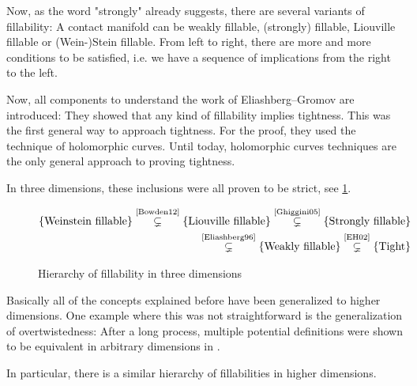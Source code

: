 Now, as the word "strongly" already suggests, there are several variants of fillability:
A contact manifold can be weakly fillable, (strongly) fillable, Liouville fillable or (Wein-)Stein fillable.
From left to right, there are more and more conditions to be satisfied, i.e. we have a sequence
of implications from the right to the left.

Now, all components to understand the work of Eliashberg--Gromov are introduced:
They showed that any kind of fillability implies tightness.
This was the first general way to approach tightness.
For the proof, they used the technique of holomorphic curves. Until today, holomorphic curves techniques are
the only general approach to proving tightness.

In three dimensions, these inclusions were all proven to be strict, see \cref{fig:fillability}.
\begin{figure}
    \begin{align*}
        \{\text{Weinstein fillable}\} \stackrel{\text{\cite{Bowden12}}}{\subsetneq} 
        \{\text{Liouville fillable}\} \stackrel{\text{\cite{Ghiggini05}}}{\subsetneq} 
        \{\text{Strongly  fillable}\}\\ \stackrel{\text{\cite{Eliashberg96}}}{\subsetneq}
        \{\text{Weakly    fillable}\} \stackrel{\text{\cite{EH02}}}{\subsetneq}
        \{\text{Tight}\}
    \end{align*}
    \caption{Hierarchy of fillability in three dimensions}
    \label{fig:fillability}
\end{figure}

Basically all of the concepts explained before have been generalized to higher dimensions.
One example where this was not straightforward is the generalization of overtwistedness: 
After a long process, multiple potential definitions were shown to be equivalent in arbitrary dimensions in \cite{BEM15}.

In particular, there is a similar hierarchy of fillabilities in higher dimensions.

